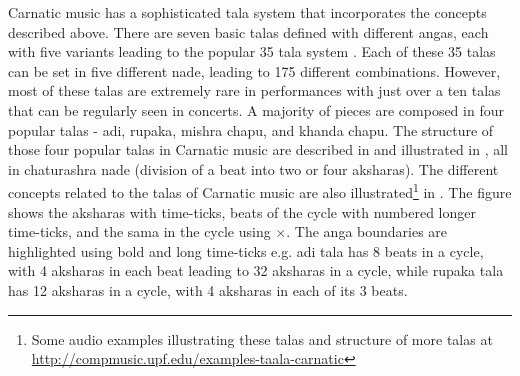 Carnatic music has a sophisticated \gls{tala} system that incorporates the concepts described above. There are seven basic \glspl{tala} defined with different \glspl{anga}, each with five variants leading to the popular 35 \gls{tala} system \cite{samba:98:southMusic}. Each of these 35 \glspl{tala} can be set in five different \gls{nade}, leading to 175 different combinations. However, most of these \glspl{tala} are extremely rare in performances with just over a ten \glspl{tala} that can be regularly seen in concerts. A majority of pieces are composed in four popular \glspl{tala} - \gls{adi}, \gls{rupaka}, \gls{mishra chapu}, and \gls{khanda chapu}. The structure of those four popular \glspl{tala} in Carnatic music are described in  and illustrated in , all in \gls{chaturashra} \gls{nade} (division of a beat into two or four \glspl{akshara}). The different concepts related to the \glspl{tala} of Carnatic music are also illustrated\footnote{Some audio examples illustrating these \glspl{tala} and structure of more \glspl{tala} at \url{http://compmusic.upf.edu/examples-taala-carnatic}} in . The figure shows the \glspl{akshara} with time-ticks, beats of the cycle with numbered longer time-ticks, and the sama in the cycle using $\times$. The \gls{anga} boundaries are highlighted using bold and long time-ticks e.g. \gls{adi} \gls{tala} has 8 beats in a cycle, with 4 \glspl{akshara} in each beat leading to 32 \glspl{akshara} in a cycle, while \gls{rupaka} \gls{tala} has 12 \glspl{akshara} in a cycle, with 4 \glspl{akshara} in each of its 3 beats. 


